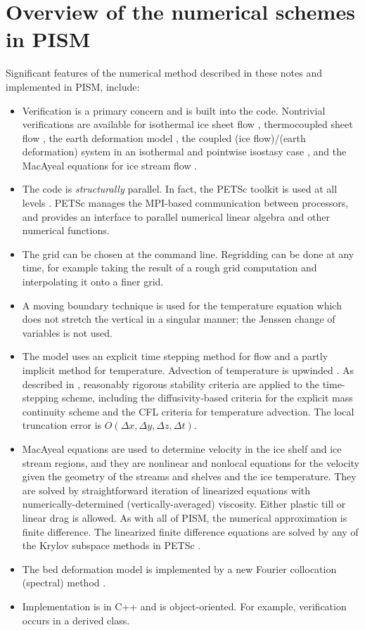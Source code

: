 \documentclass[11pt,final]{amsart}
\begin{document}
\section{Overview of the numerical schemes in PISM}
Significant features of the numerical method described in these notes and implemented in PISM, include:\begin{itemize}
\item Verification \cite{Roache} is a primary concern and is built into the code.  Nontrivial verifications are available for isothermal ice sheet flow \cite{BLKCB}, thermocoupled sheet flow \cite{BB,BBL}, the earth deformation model \cite{BLKfastearth}, the coupled (ice flow)/(earth deformation) system in an isothermal and pointwise isostasy  case \cite{BLKfastearth}, and the MacAyeal equations for ice stream flow \cite{SchoofStream,BrownPresentation}.
\item The code is \emph{structurally} parallel.  In fact, the PETSc toolkit is used at all levels \cite{petsc-web-page,petsc-user-ref}.  PETSc manages the MPI-based communication between processors, and provides an interface to parallel numerical linear algebra and other numerical functions.
\item The grid can be chosen at the command line.  Regridding can be done at any time, for example taking the result of a rough grid computation and interpolating it onto a finer grid.
\item A moving boundary technique is used for the temperature equation which does not stretch the vertical in a singular manner; the Jenssen \cite{Jenssen} change of variables is not used.
\item The model uses an explicit time stepping method for flow and a partly implicit method for temperature.  Advection of temperature is upwinded \cite{MortonMayers}.  As described  in  \cite{BBL}, reasonably rigorous stability criteria are applied to the time-stepping scheme, including the diffusivity-based criteria for the explicit mass continuity scheme and the CFL criteria \cite{MortonMayers} for temperature advection.  The local truncation error is $O(\Delta x,\Delta y,\Delta z,\Delta t)$.
\item MacAyeal equations \cite{MacAyeal,SchoofStream} are used to determine velocity in the ice shelf and ice stream regions, and they are nonlinear and nonlocal equations for the velocity given the geometry of the streams and shelves and the ice temperature.  They are solved by straightforward iteration of linearized equations with numerically-determined (vertically-averaged) viscosity.  Either plastic till or linear drag is allowed.  As with all of PISM, the numerical approximation is finite difference.  The linearized finite difference equations are solved by any of the Krylov subspace methods in PETSc \cite{BrownPresentation,petsc-web-page,petsc-user-ref}.
\item The bed deformation model is implemented by a new Fourier collocation (spectral) method \cite{BLKfastearth}.
\item Implementation is in C++ and is object-oriented.  For example, verification occurs in a derived class.
\end{itemize}
\end{document}
